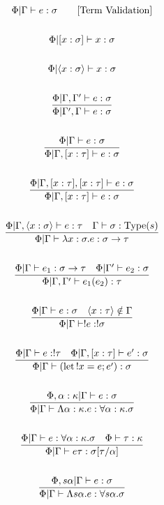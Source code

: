 \documentclass {article}
\begin{document}
\begin{gather*}
\Phi | \Gamma \vdash e : \sigma \tag* {[\text{Term Validation}]}  \\
\\
\Phi | [x : \sigma] \vdash x : \sigma \\
\\
\Phi | \langle x : \sigma \rangle \vdash x : \sigma \\
\\
\frac
{\Phi | \Gamma, \Gamma' \vdash e : \sigma}
{\Phi | \Gamma', \Gamma \vdash e : \sigma} \\
\\
\frac
{\Phi | \Gamma \vdash e : \sigma}
{\Phi | \Gamma, [ x : \tau ] \vdash e : \sigma } \\
\\
\frac
{\Phi | \Gamma, [x : \tau], [x : \tau] \vdash e : \sigma}
{\Phi | \Gamma, [x : \tau] \vdash e : \sigma } \\
\\
\frac
{\Phi | \Gamma, \langle x : \sigma \rangle \vdash e : \tau \quad \Gamma \vdash \sigma : \text{Type} (s)}
{\Phi | \Gamma \vdash \lambda x:\sigma. e : \sigma \to \tau } \\
\\
\frac
{\Phi | \Gamma \vdash e_1 : \sigma \to \tau \quad \Phi | \Gamma' \vdash e_2 : \sigma}
{\Phi | \Gamma, \Gamma' \vdash e_1(e_2) : \tau} \\
\\
\frac
{\Phi | \Gamma \vdash e : \sigma \quad \langle x : \tau \rangle \notin \Gamma }
{\Phi | \Gamma \vdash !e : !\sigma } \\
\\
\frac
{\Phi | \Gamma \vdash e : !\tau \quad \Phi | \Gamma, [x : \tau] \vdash e' : \sigma }
{\Phi | \Gamma \vdash (\text{let} \, !x = e; e') : \sigma}  \\
\\
\frac
{\Phi, \alpha : \kappa | \Gamma \vdash e : \sigma}
{\Phi | \Gamma \vdash \Lambda \alpha : \kappa. e : \forall \alpha : \kappa. \sigma } \\
\\
\frac
{\Phi | \Gamma \vdash e : \forall \alpha : \kappa. \sigma \quad \Phi \vdash \tau : \kappa }
{\Phi | \Gamma \vdash e \tau : \sigma [\tau/\alpha] } \\
\\
\frac
{\Phi, s \alpha | \Gamma \vdash e : \sigma}
{\Phi | \Gamma \vdash \Lambda s \alpha. e : \forall s \alpha. \sigma} \\
\\

\end{gather*}
\end{document}

